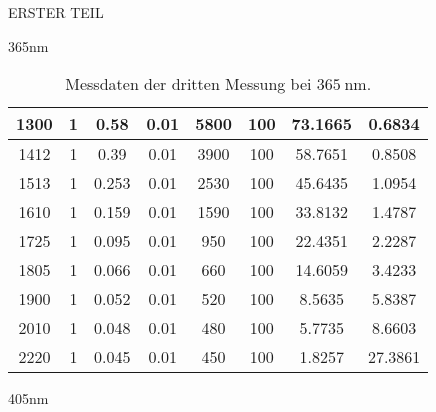 \begin{appendix}
\begin{chapter}{ERSTER TEIL}
\begin{section}{365nm}
\begin{table}[htbp]
\begin{tabular}{|c|c|c|c|c|c|c|c|}
            1300 & 1 & 0.58 & 0.01 & 5800 & 100 & 73.1665 & 0.6834 \\ \hline
            1412 & 1 & 0.39 & 0.01 & 3900 & 100 & 58.7651 & 0.8508 \\ \hline
            1513 & 1 & 0.253 & 0.01 & 2530 & 100 & 45.6435 & 1.0954 \\ \hline
            1610 & 1 & 0.159 & 0.01 & 1590 & 100 & 33.8132 & 1.4787 \\ \hline
            1725 & 1 & 0.095 & 0.01 & 950 & 100 & 22.4351 & 2.2287 \\ \hline
            1805 & 1 & 0.066 & 0.01 & 660 & 100 & 14.6059 & 3.4233 \\ \hline
            1900 & 1 & 0.052 & 0.01 & 520 & 100 & 8.5635 & 5.8387 \\ \hline
            2010 & 1 & 0.048 & 0.01 & 480 & 100 & 5.7735 & 8.6603 \\ \hline
            2220 & 1 & 0.045 & 0.01 & 450 & 100 & 1.8257 & 27.3861 \\ \hline
          \end{tabular}
          \caption{Messdaten der dritten Messung bei $\SI{365}{\nano\meter}$.}
          \label{tab:365_3}
        \end{table}
        
      \end{section}
      
      
      
      \newpage
      \begin{section}{405nm}
        \label{Anhang:chp:ERSTERTEIL:sec:405}
        

\end{section}
\end{chapter}
\end{appendix}
